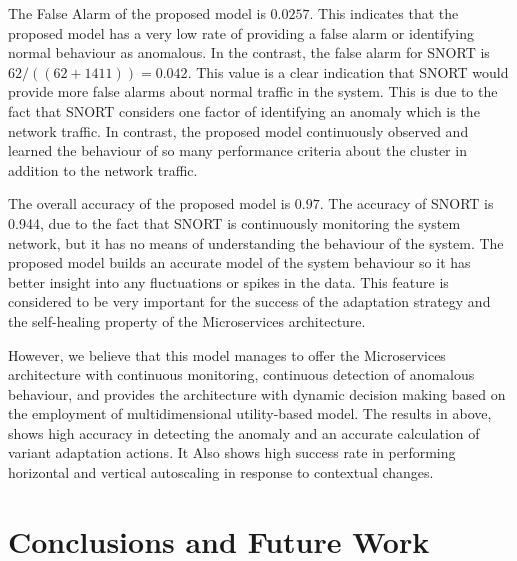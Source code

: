 \documentclass{ieeeaccess}
\begin{document}
The False Alarm of the proposed model  is $0.0257$. This indicates that the proposed model has a very low rate of providing a false alarm or identifying normal behaviour as anomalous. In the contrast, the false alarm for SNORT is $62/((62+1411))=0.042$. This value is a clear indication that SNORT would provide more false alarms about normal traffic in the system. This is due to the fact that SNORT considers one factor of identifying an anomaly which is the network traffic. In contrast, the proposed model continuously observed and learned the behaviour of so many performance criteria about the cluster in addition to the network traffic. 




The overall accuracy of the proposed model is $0.97$. The accuracy of SNORT is 0.944, due to the fact that SNORT is continuously monitoring the system network, but it has no means of understanding the behaviour of the system. The proposed model builds an accurate model of the system behaviour so it has better insight into any fluctuations or spikes in the data. This feature is considered to be very important for the success of the adaptation strategy and the self-healing property of the Microservices architecture. 

However, we believe that this model manages to offer the Microservices architecture with continuous monitoring, continuous detection of anomalous behaviour, and provides the architecture with dynamic decision making based on the employment of multidimensional utility-based model. The results in above, shows high accuracy in detecting the anomaly and an accurate calculation of variant adaptation actions. It Also shows high success rate in performing horizontal and vertical autoscaling in response to contextual changes. 




\section{Conclusions and Future Work}\label{sec:Conclusion}
\end{document}

